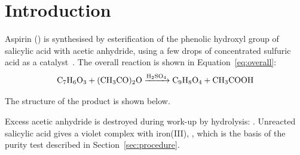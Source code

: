 \section{Introduction}
\label{sec:intro}

Aspirin () is synthesised by esterification of the phenolic hydroxyl
group of salicylic acid with acetic anhydride, using a few drops of concentrated
sulfuric acid as a catalyst~\cite{clayden2012,pavia2015}. The overall reaction is
shown in Equation~\eqref{eq:overall}:
\begin{equation}
  \ce{C7H6O3 + (CH3CO)2O ->[\ce{H2SO4}] C9H8O4 + CH3COOH}
  \label{eq:overall}
\end{equation}

The structure of the product is shown below.

\begin{center}
\end{center}

Excess acetic anhydride is destroyed during work-up by hydrolysis:
. Unreacted salicylic acid gives a violet
complex with iron(III), , which is the
basis of the purity test described in Section~\ref{sec:procedure}.
